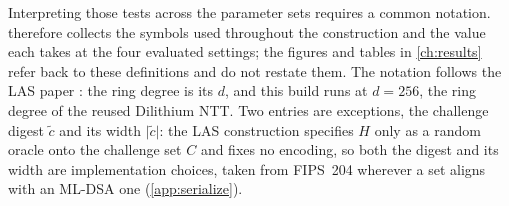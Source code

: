 Interpreting those tests across the parameter sets requires a common notation.
 therefore collects the symbols used throughout the construction
and the value each takes at the four evaluated settings; the figures and tables in
\cref{ch:results} refer back to these definitions and do not restate them. The
notation follows the LAS paper \cite{esgin2020post}: the ring degree is its $d$, and
this build runs at $d=256$, the ring degree of the reused Dilithium NTT. Two entries
are exceptions, the challenge digest $\tilde c$ and its width $\lvert\tilde c\rvert$: the
LAS construction \cite{esgin2020post} specifies $H$ only as a random oracle onto the
challenge set $C$
and fixes no encoding, so both the digest and its width are implementation choices,
taken from FIPS~204 wherever a set aligns with an ML-DSA one (\cref{app:serialize}).

